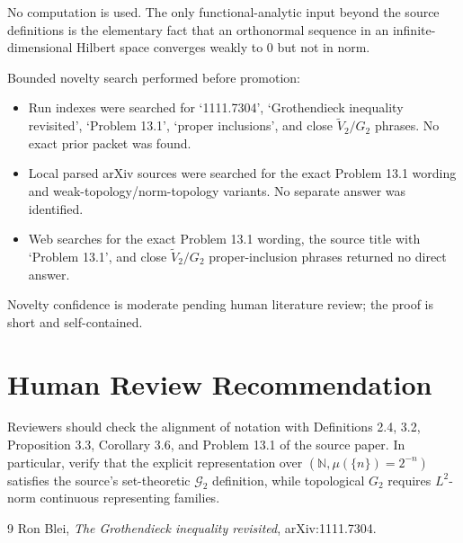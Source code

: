 \documentclass[11pt]{article}
\begin{document}
No computation is used. The only functional-analytic input beyond the source
definitions is the elementary fact that an orthonormal sequence in an
infinite-dimensional Hilbert space converges weakly to \(0\) but not in norm.

Bounded novelty search performed before promotion:
\begin{itemize}
\item Run indexes were searched for `1111.7304', `Grothendieck inequality
revisited', `Problem 13.1', `proper inclusions', and close
\(\widetilde V_2/G_2\) phrases. No exact prior packet was found.
\item Local parsed arXiv sources were searched for the exact Problem 13.1
wording and weak-topology/norm-topology variants. No separate answer was
identified.
\item Web searches for the exact Problem 13.1 wording, the source title with
`Problem 13.1', and close \(\widetilde V_2/G_2\) proper-inclusion phrases
returned no direct answer.
\end{itemize}
Novelty confidence is moderate pending human literature review; the proof is
short and self-contained.

\section*{Human Review Recommendation}

Reviewers should check the alignment of notation with Definitions 2.4, 3.2,
Proposition 3.3, Corollary 3.6, and Problem 13.1 of the source paper. In
particular, verify that the explicit representation over
\((\mathbb N,\mu(\{n\})=2^{-n})\) satisfies the source's set-theoretic
\(\mathcal G_2\) definition, while topological \(G_2\) requires \(L^2\)-norm
continuous representing families.

\begin{thebibliography}{9}
Ron Blei, \emph{The Grothendieck inequality revisited}, arXiv:1111.7304.
\end{thebibliography}
\end{document}
